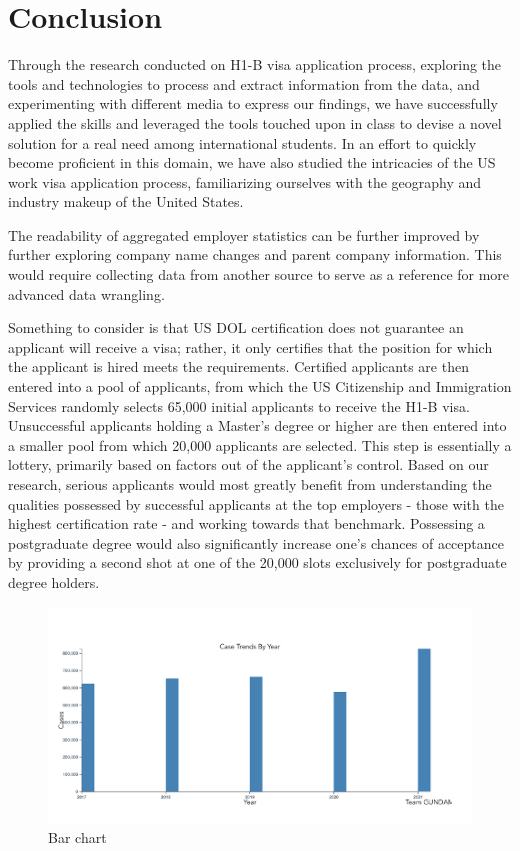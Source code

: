 \documentclass[sigconf]{acmart}
\begin{document}
\section{Conclusion}

Through the research conducted on H1-B visa application process, exploring the tools and technologies 
to process and extract information from the data, and experimenting with different media to 
express our findings, we have successfully applied the skills and leveraged the tools touched 
upon in class to devise a novel solution for a real need among international students. 
In an effort to quickly become proficient in this domain, we have also studied 
the intricacies of the US work visa application process, familiarizing ourselves 
with the geography and industry makeup of the United States. 

The readability of aggregated employer statistics can be further improved by further exploring 
company name changes and parent company information. This would require collecting data from another 
source to serve as a reference for more advanced data wrangling. 

Something to consider is that US DOL certification does not guarantee an applicant will receive a visa; 
rather, it only certifies that the 
position for which the applicant is hired meets the requirements. Certified applicants are then entered into a pool of 
applicants, from which the US Citizenship and Immigration Services randomly selects 65,000 initial applicants to receive 
the H1-B visa. Unsuccessful applicants holding a Master's degree or higher are then entered into a smaller pool from which 
20,000 applicants are selected. This step is essentially a lottery, primarily based on factors out of 
the applicant's control. Based on our research, serious applicants would most greatly benefit from understanding the 
qualities possessed by successful applicants at the top employers - those with the highest certification rate - and 
working towards that benchmark. Possessing a postgraduate degree would also significantly increase one's chances of 
acceptance by providing a second shot at one of the 20,000 slots exclusively for postgraduate degree holders. 



\begin{figure}
  \includegraphics[width=\linewidth]{fig3.png}
  \caption{Bar chart}
  \label{fig:barchart}
\end{figure}
\end{document}
